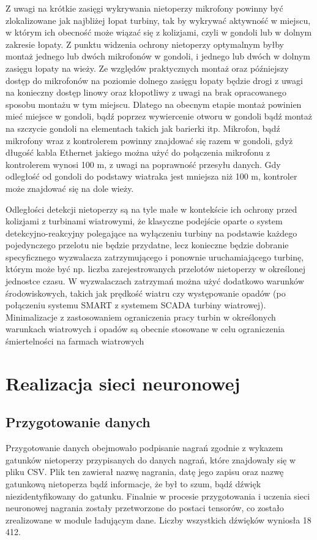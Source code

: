 \documentclass{sprz}
\begin{document}
Z uwagi na krótkie zasięgi wykrywania nietoperzy mikrofony powinny być zlokalizowane jak najbliżej łopat turbiny, tak by wykrywać aktywność w miejscu, w którym ich obecność może wiązać się z kolizjami, czyli w gondoli lub w dolnym zakresie łopaty. Z punktu widzenia ochrony nietoperzy optymalnym byłby montaż jednego lub dwóch mikrofonów w gondoli, i jednego lub dwóch w dolnym zasięgu łopaty na wieży. Ze względów praktycznych montaż oraz późniejszy dostęp do mikrofonów na poziomie dolnego zasięgu łopaty będzie drogi z uwagi na konieczny dostęp linowy oraz kłopotliwy z uwagi na brak opracowanego sposobu montażu w tym miejscu. Dlatego na obecnym etapie montaż powinien mieć miejsce w gondoli, bądź poprzez wywiercenie otworu w gondoli bądź montaż na szczycie gondoli na elementach takich jak barierki itp.
Mikrofon, bądź mikrofony wraz z kontrolerem powinny znajdować się razem w gondoli, gdyż długość kabla Ethernet jakiego można użyć do połączenia mikrofonu z kontrolerem wynosi 100 m, z uwagi na poprawność przesyłu danych. Gdy odległość od gondoli do podstawy wiatraka jest mniejsza niż 100 m, kontroler może znajdować się na dole wieży.

Odległości detekcji nietoperzy są na tyle małe w kontekście ich ochrony przed kolizjami z turbinami wiatrowymi, że klasyczne podejście oparte o system detekcyjno-reakcyjny polegające na wyłączeniu turbiny na podstawie każdego pojedynczego przelotu nie będzie przydatne, lecz konieczne będzie dobranie specyficznego wyzwalacza zatrzymującego i ponownie uruchamiającego turbinę, którym może być np. liczba zarejestrowanych przelotów nietoperzy w określonej jednostce czasu. W wyzwalaczach zatrzymań można użyć dodatkowo warunków środowiskowych, takich jak prędkość wiatru czy występowanie opadów (po połączeniu systemu SMART z systemem SCADA turbiny wiatrowej). Minimalizacje z zastosowaniem ograniczenia pracy turbin w określonych warunkach wiatrowych i opadów są obecnie stosowane w celu ograniczenia śmiertelności na farmach wiatrowych \cite{Wytyczne}

\chapter{Realizacja sieci neuronowej}

\section{Przygotowanie danych}
Przygotowanie danych obejmowało podpisanie nagrań zgodnie z wykazem gatunków nietoperzy przypisanych do danych nagrań, które znajdowały się w pliku CSV. Plik ten zawierał nazwę nagrania, datę jego zapisu oraz nazwę gatunkową nietoperza bądź informacje, że był to szum, bądź dźwięk niezidentyfikowany do gatunku. Finalnie w procesie przygotowania i uczenia sieci neuronowej nagrania zostały przetworzone do postaci tensorów, co zostało zrealizowane w module ładującym dane. Liczby wszystkich dźwięków wyniosła 18 412.
\end{document}
